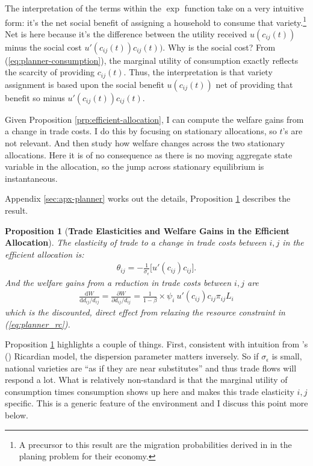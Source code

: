 \documentclass[12pt,pdftex]{article}
\newtheorem{prp}{Proposition}
\def\citeapos#1{\citeauthor{#1}'s (\citeyear{#1})}
\begin{document}
\begin{onehalfspacing}
The interpretation of the terms within the $\exp$ function take on a very intuitive form: it's the net social benefit of assigning a household to consume that variety.\footnote{A precursor to this result are the migration probabilities derived in \citet*{lagakos2023welfare} in the planing problem for their economy.} Net is here because it's the difference between the utility received $u(c_{ij}(t))$ minus the social cost $u'(c_{ij}(t))c_{ij}(t))$. Why is the social cost? From (\ref{eq:planner-consumption}), the marginal utility of consumption exactly reflects the scarcity of providing $c_{ij}(t)$. Thus, the interpretation is that variety assignment is based upon the social benefit $u(c_{ij}(t))$ net of providing that benefit so minus $u'(c_{ij}(t))c_{ij}(t)$.

Given Proposition \ref{prp:efficient-allocation}, I can compute the welfare gains from a change in trade costs. I do this by focusing on stationary allocations, so $t$'s are not relevant. And then study how welfare changes across the two stationary allocations. Here it is of no consequence as there is no moving aggregate state variable in the allocation, so the jump across stationary equilibrium is instantaneous.

Appendix \ref{sec:apx-planner} works out the details, Proposition \ref{prp:gains-efficient-allocation} describes the result.

\begin{prp}[\textbf{Trade Elasticities and Welfare Gains in the Efficient Allocation}]\label{prp:gains-efficient-allocation} The elasticity of trade to a change in trade costs between $i,j$ in the efficient allocation is:
\begin{align}
\theta_{ij} =  -\frac{1}{\sigma_{\epsilon}} \bigg [ u'(c_{ij}) c_{ij} \bigg]. \label{eq:eff-trade-elasticity}
\end{align}
And the welfare gains from a reduction in trade costs between $i,j$ are
\begin{align}
\frac{\mathrm{d} W}{\mathrm{d} d_{ij} / d_{ij}} = \frac{\partial W}{\partial d_{ij} / d_{ij}} = \frac{1}{1-\beta} \times \psi_{i} \ u'(c_{ij}) c_{ij} \pi_{ij} L_i
\label{eq:eff-trade-gains}
\end{align}
which is the discounted, direct effect from relaxing the resource constraint in (\ref{eq:planner_rc}).
\end{prp}
Proposition \ref{prp:gains-efficient-allocation} highlights a couple of things. First, consistent with intuition from \citeapos{eaton2002technology} Ricardian model, the dispersion parameter matters inversely. So if $\sigma_{\epsilon}$ is small, national varieties are ``as if they are near substitutes'' and thus trade flows will respond a lot. What is relatively non-standard is that the marginal utility of consumption times consumption shows up here and makes this trade elasticity $i,j$ specific. This is a generic feature of the environment and I discuss this point more below.


\end{onehalfspacing}
\end{document}
